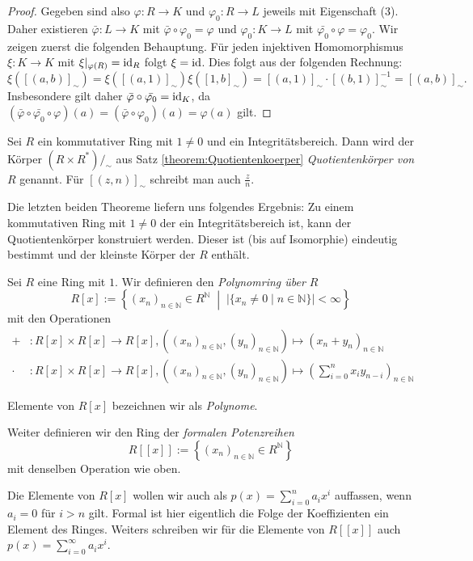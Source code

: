\begin{proof}
    Gegeben sind also $\varphi:R\to K$ und $\varphi_0:R\to L$ jeweils mit Eigenschaft (3).
    Daher existieren $\bar{\varphi}:L\to K$ mit $\bar{\varphi}\circ \varphi_0=\varphi$ und ${\varphi_0}:K\to L$
    mit $\bar{\varphi_0}\circ \varphi=\varphi_0$.
    Wir zeigen zuerst die folgenden Behauptung. Für jeden injektiven Homomorphismus
    $\xi:K\to K$ mit $\xi|_{\varphi(R)}=\operatorname{id}_R$ folgt $\xi=\operatorname{id}$. Dies folgt aus der folgenden Rechnung:
    $$
        \xi([(a,b)]_\sim)=\xi([(a,1)]_\sim)\xi([1,b]_\sim)=[(a,1)]_\sim\cdot [(b,1)]_\sim^{-1}=[(a,b)]_\sim.
    $$
    Insbesondere gilt daher $\bar{\varphi}\circ \bar{\varphi_0}=\operatorname{id}_K$, da $(\bar{\varphi}\circ\bar{\varphi_0}\circ\varphi)(a)=(\bar{\varphi}\circ\varphi_0)(a)=\varphi(a)$ gilt.
\end{proof}

\begin{definition}
    Sei $R$ ein kommutativer Ring mit $1\neq 0$ und ein Integritätsbereich. Dann wird der Körper
    $(R\times R^*)/_\sim$ aus Satz \ref{theorem:Quotientenkoerper} \emph{Quotientenk\"orper von $R$} genannt.
    Für $[(z,n)]_\sim$ schreibt man auch $\frac{z}{n}$.
\end{definition}

\begin{remark}
    Die letzten beiden Theoreme liefern uns folgendes Ergebnis: Zu einem kommutativen Ring mit $1\neq 0$ der ein Integritätsbereich
    ist, kann der Quotientenk\"orper konstruiert werden. Dieser ist (bis auf Isomorphie) eindeutig bestimmt und der kleinste Körper
    der $R$ enthält.
\end{remark}

\begin{definition}\label{def:polynomring}
    Sei $R$ eine Ring mit $1$. Wir definieren den \emph{Polynomring über $R$}
    $$R[x]:=\left\{(x_n)_{n\in \mathbb{N}} \in R^\mathbb{N} \;\middle|\; \vert\{x_n\neq 0\mid n\in \mathbb{N}\}\vert<\infty\right\}$$
    mit den Operationen
    \begin{align*}
        + &: R[x] \times R[x] \to R[x], ((x_n)_{n\in \mathbb{N}}, (y_n)_{n\in\mathbb{N}}) \mapsto (x_n+y_n)_{n\in\mathbb{N}}\\
        \cdot &: R[x] \times R[x] \to R[x], ((x_n)_{n\in \mathbb{N}}, (y_n)_{n\in\mathbb{N}}) \mapsto \left(\sum_{i=0}^n x_i y_{n-i}\right)_{n\in\mathbb{N}}
    \end{align*}

    Elemente von $R[x]$ bezeichnen wir als \emph{Polynome}.

    Weiter definieren wir den Ring der \emph{formalen Potenzreihen} 
    $$R[[x]]:=\left\{(x_n)_{n \in \mathbb{N}} \in R^\mathbb{N}\right\}$$
    mit denselben Operation wie oben. 
    
    Die Elemente von $R[x]$ wollen wir auch als $p(x)=\sum_{i=0}^na_ix^i$ auffassen, wenn $a_i=0$ für $i>n$ gilt. Formal ist hier eigentlich die Folge
    der Koeffizienten ein Element des Ringes. Weiters schreiben wir für die Elemente von $R[[x]]$ auch
    $p(x)=\sum_{i=0}^\infty a_ix^i$.
\end{definition}

